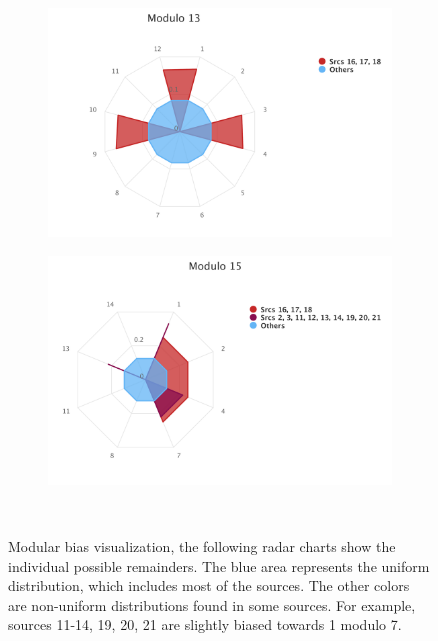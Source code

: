 \begin{figure}[H]
\begin{subfigure}{0.45\textwidth}
	\includegraphics[width=\linewidth]{tex/images/analysis/mod13}
\end{subfigure}
\hfill
\begin{subfigure}{0.45\textwidth}
	\includegraphics[width=\linewidth]{tex/images/analysis/mod15}
\end{subfigure}\\

\caption{Modular bias visualization, the following radar charts show the individual possible remainders. The blue area represents the uniform distribution, which includes most of the sources. The other colors are non-uniform distributions found in some sources. For example, sources 11-14, 19, 20, 21 are slightly biased towards 1 modulo 7.}
\end{figure}

